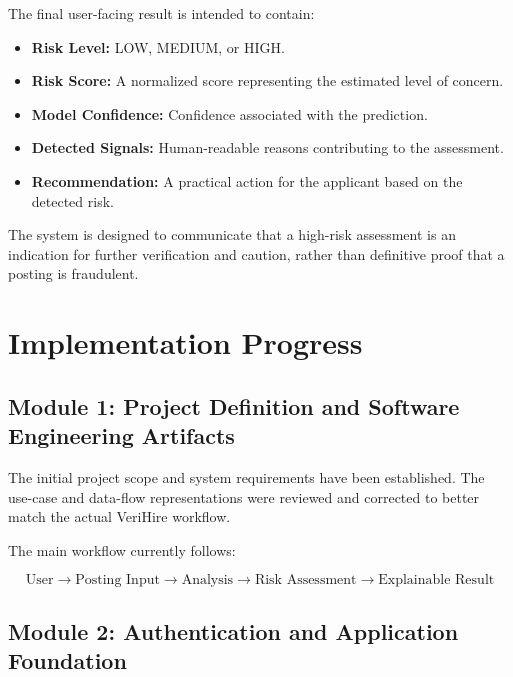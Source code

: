 \documentclass[12pt,a4paper]{report}
\begin{document}
The final user-facing result is intended to contain:

\begin{itemize}

    \item \textbf{Risk Level:}
    LOW, MEDIUM, or HIGH.

    \item \textbf{Risk Score:}
    A normalized score representing the estimated level of concern.

    \item \textbf{Model Confidence:}
    Confidence associated with the prediction.

    \item \textbf{Detected Signals:}
    Human-readable reasons contributing to the assessment.

    \item \textbf{Recommendation:}
    A practical action for the applicant based on the detected risk.

\end{itemize}

The system is designed to communicate that a high-risk assessment is an indication for further verification and caution, rather than definitive proof that a posting is fraudulent.


\section{Implementation Progress}

\subsection{Module 1: Project Definition and Software Engineering Artifacts}

The initial project scope and system requirements have been established. The use-case and data-flow representations were reviewed and corrected to better match the actual VeriHire workflow.

The main workflow currently follows:

\begin{equation}
\text{User} \rightarrow \text{Posting Input} \rightarrow \text{Analysis} \rightarrow
\text{Risk Assessment} \rightarrow \text{Explainable Result}
\end{equation}


\subsection{Module 2: Authentication and Application Foundation}
\end{document}
